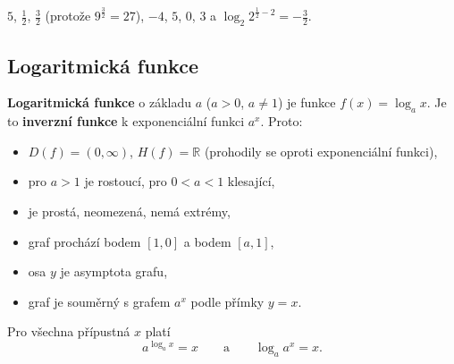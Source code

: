 \begin{solution}
  $5$, $\frac{1}{2}$, $\frac{3}{2}$ (protože $9^{\frac{3}{2}} = 27$), $-4$, $5$, $0$, $3$ a $\log_2 2^{\frac{1}{2} - 2} = -\frac{3}{2}$.
\end{solution}

\subsection{Logaritmická funkce}\label{sec:logaritmicka-funkce}

\begin{definitionbox}
  \textbf{Logaritmická funkce} o základu $a$ ($a > 0$, $a\neq 1$) je funkce $f(x) = \log_a x$. Je to \textbf{inverzní funkce} k exponenciální funkci $a^x$. Proto:
  \begin{itemize}
    \item $D(f) = (0, \infty)$, $H(f) = \mathbb{R}$ (prohodily se oproti exponenciální funkci),
    \item pro $a > 1$ je rostoucí, pro $0 < a < 1$ klesající,
    \item je prostá, neomezená, nemá extrémy,
    \item graf prochází bodem $[1, 0]$ a bodem $[a, 1]$,
    \item osa $y$ je asymptota grafu,
    \item graf je souměrný s grafem $a^x$ podle přímky $y = x$.
  \end{itemize}
  Pro všechna přípustná $x$ platí
  \begin{equation*}
    a^{\log_a x} = x\qquad\text{a}\qquad\log_a a^x = x.
  \end{equation*}
\end{definitionbox}

\begin{center}
\end{center}

